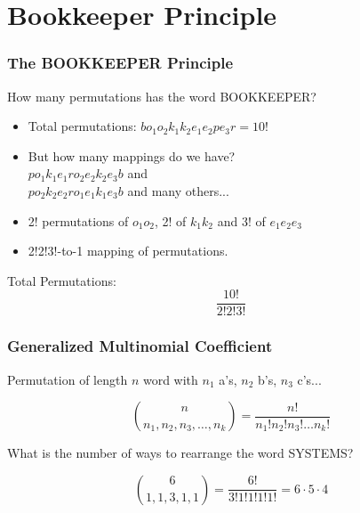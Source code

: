 \documentclass{beamer}
\begin{document}
\section{Bookkeeper Principle}

\begin{frame}
  \frametitle{The BOOKKEEPER Principle}

  {\larger
    How many permutations has the word \alert{BOOKKEEPER}?

    \bigskip

    \begin{itemize}
    \item Total permutations: $bo_1o_2k_1k_2e_1e_2pe_3r = 10!$

      \bigskip
      
    \item But how many mappings do we have?\\
      $po_1k_1e_1ro_2e_2k_2e_3b$ and\\
      $po_2k_2e_2ro_1e_1k_1e_3b$ and many others...

      \bigskip

    \item 2! permutations of $o_1o_2$, 2! of $k_1k_2$ and 3! of $e_1e_2e_3$
    \item 2!2!3!-to-1 mapping of permutations.            
    \end{itemize}

    \bigskip

    Total Permutations:
    \begin{equation*}
      \frac{10!}{2!2!3!}
    \end{equation*}
  }
\end{frame}

\begin{frame}
  \frametitle{Generalized Multinomial Coefficient}

  {\larger

    Permutation of length $n$ word with $n_1$ a's, $n_2$ b's, $n_3$ c's...

    \bigskip
    
    \begin{equation}%
      \binom{n}{n_1,n_2,n_3,\ldots,n_k} = \frac{n!}{n_1!n_2!n_3!\ldots n_k!}      
    \end{equation}

    \vfill

    What is the number of ways to rearrange the word \alert{SYSTEMS}?

    \begin{equation*}
      \binom{6}{1,1,3,1,1} = \frac{6!}{3!1!1!1!1!} = 6\cdot5\cdot4 
    \end{equation*}
    
  }
\end{frame}
\end{document}
